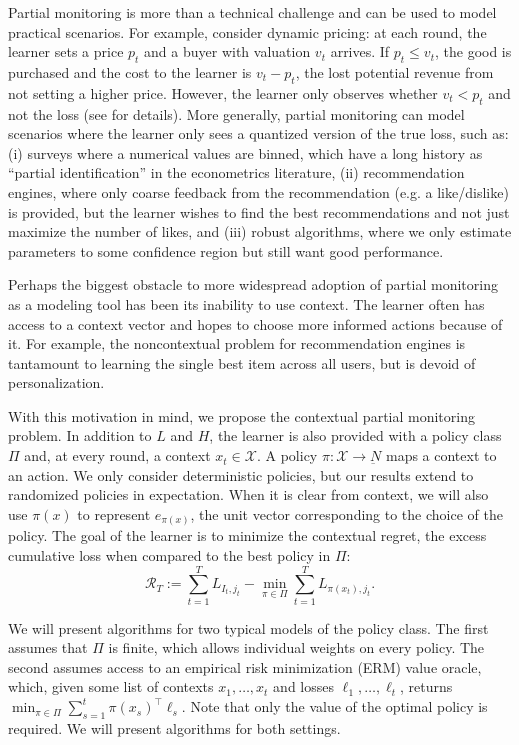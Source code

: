 \documentclass{article}
\newcommand{\regret}{\mathcal{R}}
\begin{document}
Partial monitoring is more than a technical challenge and can be used to model practical scenarios. For example, consider dynamic pricing: at each round, the learner sets a price $p_t$ and a buyer with valuation $v_t$ arrives. If $p_t \leq v_t$, the good is purchased and the cost to the learner is $v_t - p_t$, the lost potential revenue from not setting a higher price. However, the learner only observes whether $v_t < p_t$ and not the loss (see \cite{bartok2014partial} for details). More generally, partial monitoring can model scenarios where the learner only sees a quantized version of the true loss, such as:
(i) surveys where a numerical values are binned, which have a long history as ``partial identification'' in the econometrics literature,
(ii) recommendation engines, where only coarse feedback from the recommendation (e.g. a like/dislike) is provided, but the learner wishes to find the best recommendations and not just maximize the number of likes, and 
(iii) robust algorithms, where we only estimate parameters to some confidence region but still want good performance.

Perhaps the biggest obstacle to more widespread adoption of partial monitoring as a modeling tool has been its inability to use context. The learner often has access to a context vector and hopes to choose more informed actions because of it. For example, the noncontextual problem for recommendation engines is tantamount to learning the single best item across all users, but is devoid of personalization.

With this motivation in mind, we propose the contextual partial monitoring problem. In addition to $L$ and $H$, the learner is also provided with a policy class $\Pi$ and, at every round, a context $x_t\in\mathcal X$. A policy $\pi:\mathcal X \rightarrow \underbar N$ maps a context to an action. We only consider deterministic policies, but our results extend to randomized policies in expectation. When it is clear from context, we will also use $\pi(x)$ to represent $e_{\pi(x)}$, the unit vector corresponding to the choice of the policy. The goal of the learner is to minimize the contextual regret,
the excess cumulative loss when compared to the best policy in $\Pi$:
\begin{equation}
  \regret_T := \sum_{t=1}^T L_{I_t,j_t} - \min_{\pi\in\Pi}\sum_{t=1}^T L_{\pi(x_t),j_t}.
\end{equation}

We will present algorithms for two typical models of the policy class. The first assumes that  $\Pi$ is finite, which allows individual weights on every policy. The second assumes access to an empirical risk minimization (ERM) value oracle, which, given some list of contexts $x_1,\ldots, x_t$ and losses $\ell_1,\ldots, \ell_t$, returns $\min_{\pi\in\Pi}\sum_{s=1}^t \pi(x_s)^\top \ell_s$. Note that only the value of the optimal policy is required. We will present algorithms for both settings.
\end{document}
